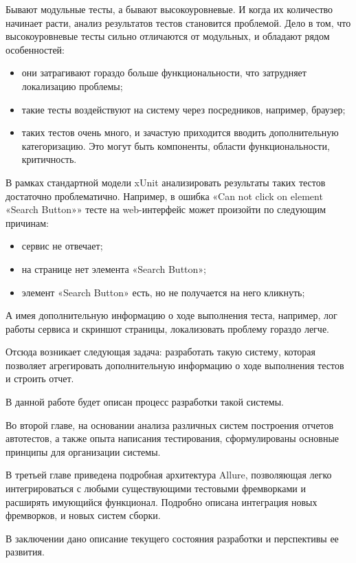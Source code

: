 \startprefacepage



Бывают модульные тесты, а бывают высокоуровневые. И когда их количество начинает расти, анализ результатов тестов становится проблемой. Дело в том, что высокоуровневые тесты сильно отличаются от модульных, и обладают рядом особенностей:

\begin{itemize}
\item они затрагивают гораздо больше функциональности, что затрудняет локализацию проблемы; 
\item такие тесты воздействуют на систему через посредников, например, браузер;
\item таких тестов очень много, и зачастую приходится вводить дополнительную категоризацию. Это могут быть компоненты, области функциональности, критичность.
\end{itemize}

В рамках стандартной модели xUnit анализировать результаты таких тестов достаточно проблематично. Например, в ошибка «Can not click on element «Search Button»» тесте на web-интерфейс может произойти по следующим причинам:

\begin{itemize}
\item сервис не отвечает;
\item на странице нет элемента «Search Button»;
\item элемент «Search Button» есть, но не получается на него кликнуть;
\end{itemize}

А имея дополнительную информацию о ходе выполнения теста, например, лог работы сервиса и скриншот страницы, локализовать проблему гораздо легче. 

Отсюда возникает следующая задача: разработать такую систему, которая позволяет агрегировать дополнительную информацию о ходе выполнения тестов и строить отчет. 

В данной работе будет описан процесс разработки такой системы.

Во второй главе, на основании анализа различных систем построения отчетов автотестов, а также опыта написания тестирования, сформулированы основные принципы для организации системы.

В третьей главе приведена подробная архитектура Allure, позволяющая легко интегрироваться с любыми существующими тестовыми фремворками и расширять имующийся функционал. Подробно описана интеграция новых фремворков, и новых систем сборки.

В заключении дано описание текущего состояния разработки и перспективы ее развития.